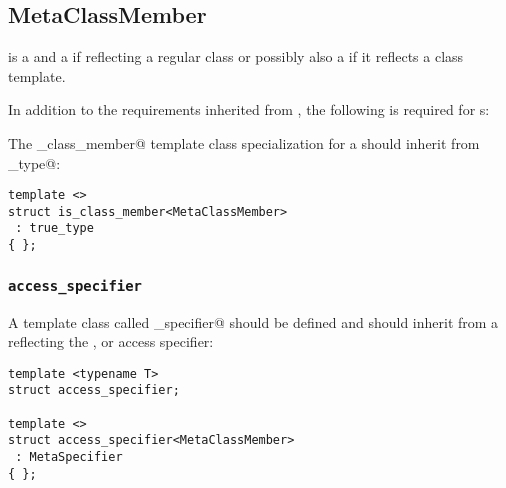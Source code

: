 \subsection{MetaClassMember}
\label{concept-MetaClassMember}


 is a  and a  if reflecting a regular class or possibly
also a  if it reflects a class template.

In addition to the requirements inherited from ,
the following is required for s:

The \verb@is_class_member@ template class specialization for a  should
inherit from \verb@true_type@:

\begin{verbatim}
template <>
struct is_class_member<MetaClassMember>
 : true_type
{ };
\end{verbatim}

\subsubsection{\texttt{access\_specifier}}

A template class called \verb@access_specifier@ should be defined and should inherit from
a  reflecting the \verb@private@, \verb@protected@ or \verb@public@
access specifier:

\begin{verbatim}
template <typename T>
struct access_specifier;

template <>
struct access_specifier<MetaClassMember>
 : MetaSpecifier
{ };
\end{verbatim}

